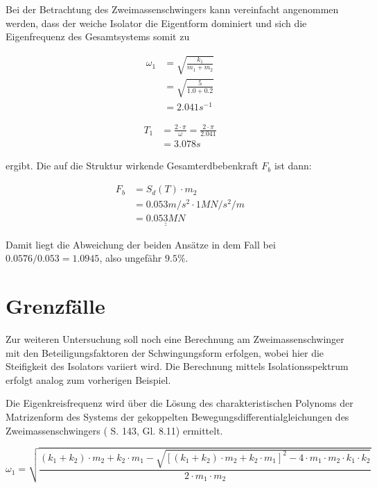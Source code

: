 Bei der Betrachtung des Zweimassenschwingers kann vereinfacht angenommen werden, dass der weiche Isolator die Eigentform dominiert \cite{AKK} und sich die Eigenfrequenz des Gesamtsystems somit zu

\begin{align*}
\omega_1 &= \sqrt{\frac{k_1}{m_1 + m_2}}\\
         &= \sqrt{\frac{5}{1.0 + 0.2}}\\
         &= 2.041 s^{-1}
\end{align*}

\begin{align*}
T_1 &= \frac{2 \cdot \pi}{\omega} = \frac{2 \cdot \pi}{2.041}\\
    &= 3.078 s
\end{align*}

ergibt. Die auf die Struktur wirkende Gesamterdbebenkraft $F_b$ ist dann:

\begin{align*}
F_b &= S_d(T) \cdot m_2\\
    &= 0.053 m/s^2 \cdot 1 MN/s^2/m\\
    &= \underline{\underline{0.053 MN}}
\end{align*}

Damit liegt die Abweichung der beiden Ansätze in dem Fall bei $0.0576/0.053=1.0945$, also ungefähr $9.5\%$.

\pagebreak

\section{Grenzfälle}
\label{sec:grenzfalle}

Zur weiteren Untersuchung soll noch eine Berechnung am Zweimassenschwinger mit den Beteiligungsfaktoren der Schwingungsform erfolgen, wobei hier die Steifigkeit des Isolators variiert wird. Die Berechnung mittels Isolationsspektrum erfolgt analog zum vorherigen Beispiel.

Die Eigenkreisfrequenz wird über die Lösung des charakteristischen Polynoms der Matrizenform des Systems der gekoppelten Bewegungsdifferentialgleichungen des Zweimassenschwingers (\cite{Pocanschi} S. 143, Gl. 8.11) ermittelt.

\begin{equation*}
\omega_1 = \sqrt{\frac{(k_1 + k_2) \cdot m_2 + k_2 \cdot m_1 - \sqrt{[(k_1 + k_2) \cdot m_2 + k_2 \cdot  m_1]^2 - 4 \cdot m_1 \cdot m_2 \cdot k_1 \cdot k_2}}{2 \cdot m_1 \cdot m_2}}
\end{equation*}

